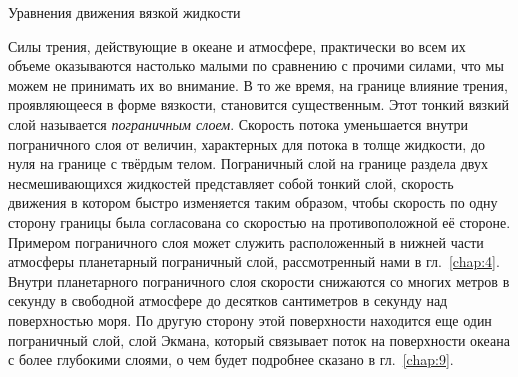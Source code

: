 
\begin{chapter}{Уравнения движения вязкой жидкости}\label{chap:8}

Силы трения, действующие в океане и атмосфере, практически во всем их объеме
оказываются настолько малыми по сравнению с прочими силами, что мы можем 
не принимать их во внимание. В то же время, на границе влияние трения, 
проявляющееся в форме вязкости, становится существенным.
Этот тонкий вязкий слой называется 
\emph{пограничным слоем}. Скорость потока 
уменьшается внутри пограничного слоя от величин, характерных для потока в
толще жидкости, до нуля на границе с твёрдым телом. Пограничный слой 
на границе раздела двух несмешивающихся жидкостей представляет собой 
тонкий слой, скорость движения в котором быстро изменяется таким образом, 
чтобы скорость по одну сторону границы была согласована со скоростью на 
противоположной её стороне. Примером пограничного слоя может служить
расположенный в нижней части атмосферы планетарный пограничный слой, 
рассмотренный нами в гл.~\ref{chap:4}.
Внутри планетарного пограничного слоя скорости снижаются со многих
метров в секунду в свободной атмосфере до десятков сантиметров в
секунду над поверхностью моря. По другую сторону этой поверхности находится
еще один пограничный слой, слой Экмана, который 
связывает поток на поверхности океана с более глубокими слоями,
о чем будет подробнее сказано в гл.~\ref{chap:9}.
%


\end{chapter}
